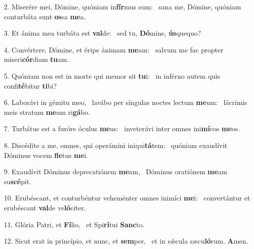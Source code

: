2. Miserére mei, Dómine, quóniam in\textbf{fír}mus sum: \ast\  sana me, Dómine, quóniam conturbáta sunt \textbf{os}sa \textbf{me}a.\

3. Et ánima mea turbáta est \textbf{val}de: \ast\  sed tu, \textbf{Dó}mine, \textbf{ús}quequo?\

4. Convértere, Dómine, et éripe ánimam \textbf{me}am: \ast\  salvum me fac propter miseri\textbf{cór}diam \textbf{tu}am.\

5. Quóniam non est in morte qui memor sit \textbf{tu}i: \ast\  in inférno autem quis confi\textbf{té}bitur \textbf{ti}bi?\

6. Laborávi in gémitu meo, \dag\  lavábo per síngulas noctes lectum \textbf{me}um: \ast\  lácrimis meis stratum \textbf{me}um ri\textbf{gá}bo.\

7. Turbátus est a furóre óculus \textbf{me}us: \ast\  inveterávi inter omnes ini\textbf{mí}cos \textbf{me}os.\

8. Discédite a me, omnes, qui operámini iniqui\textbf{tá}tem: \ast\  quóniam exaudívit Dóminus vocem \textbf{fle}tus \textbf{me}i.\

9. Exaudívit Dóminus deprecatiónem \textbf{me}am, \ast\  Dóminus oratiónem \textbf{me}am su\textbf{scé}pit.\

10. Erubéscant, et conturbéntur veheménter omnes inimíci \textbf{me}i: \ast\  convertántur et erubéscant \textbf{val}de ve\textbf{ló}citer.\

11. Glória Patri, et \textbf{Fí}lio, \ast\  et Spi\textbf{rí}tui \textbf{Sanc}to.\

12. Sicut erat in princípio, et nunc, et \textbf{sem}per, \ast\  et in sǽcula sæcu\textbf{ló}rum. \textbf{A}men.\

